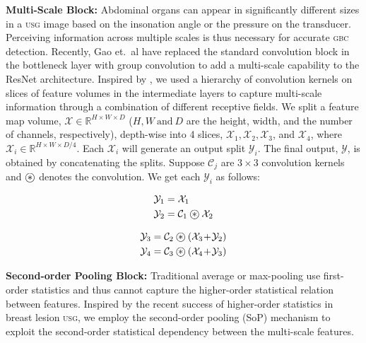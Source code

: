 \documentclass[10pt,twocolumn,letterpaper]{article}
\def\etal{{et.~al}}
\def\usg{\textsc{usg}\xspace}
\def\gbc{\textsc{gbc}\xspace}
\newcommand{\myfirstpara}[1]{\noindent \textbf{#1:}}
\newcommand{\mypara}[1]{\vspace{0.1em} \myfirstpara{#1}}
\newcommand\oast{\stackMath\mathbin{\stackinset{c}{0ex}{c}{0ex}{\ast}{\bigcirc}}}
\begin{document}
 \myfirstpara{Multi-Scale Block}
Abdominal organs can appear in significantly different sizes in a \usg image based on the insonation angle or the pressure on the transducer. Perceiving information across multiple scales is thus necessary for accurate \gbc detection. Recently, Gao \etal \cite{res2net} have replaced the standard convolution block in the bottleneck layer with group convolution to add a multi-scale capability to the ResNet architecture. Inspired by \cite{res2net}, we used a hierarchy of convolution kernels on slices of feature volumes in the intermediate layers to capture multi-scale information through a combination of different receptive fields. We split a feature map volume, $\mathcal{X} \!\in\!\mathbb{R}^{H\!\times\! W \!\times\! D}$ ($H, W ~\text{and}~D$ are the height, width, and the number of channels, respectively), depth-wise into 4 slices, $\mathcal{X}_1,\mathcal{X}_2,\mathcal{X}_3$, and $\mathcal{X}_4$, where $\mathcal{X}_i \!\in\! \mathbb{R}^{H\!\times\! W\!\times\! D/4}$. Each $\mathcal{X}_i$ will generate an output split $\mathcal{Y}_i$. The final output, $\mathcal{Y}$, is obtained by concatenating the splits. Suppose $\mathcal{C}_j$ are $3\!\times\!3$ convolution kernels and $\oast$ denotes the convolution. We get each $\mathcal{Y}_i$ as follows:
\linebreak
\begin{minipage}{.4\linewidth}
\vspace{-1em}
\begin{align}
    \mathcal{Y}_1 &= \mathcal{X}_1 \\
    \mathcal{Y}_2 &= \mathcal{C}_1 \oast \mathcal{X}_2
\end{align}
\end{minipage}
\begin{minipage}{.6\linewidth}
\vspace{-1em}
\begin{align}
    \mathcal{Y}_3 &= \mathcal{C}_2 \oast (\mathcal{X}_3 \!+\! \mathcal{Y}_2) \\
    \mathcal{Y}_4 &= \mathcal{C}_3 \oast (\mathcal{X}_4 \!+\! \mathcal{Y}_3)
\end{align}
\end{minipage}

\mypara{Second-order Pooling Block}
Traditional average or max-pooling use first-order statistics and thus cannot capture the higher-order statistical relation between features. Inspired by the recent success of higher-order statistics in breast lesion \usg \cite{ning2020multi, zhu2020second}, we employ the second-order pooling (SoP) mechanism to exploit the second-order statistical dependency between the multi-scale features.  
\end{document}
